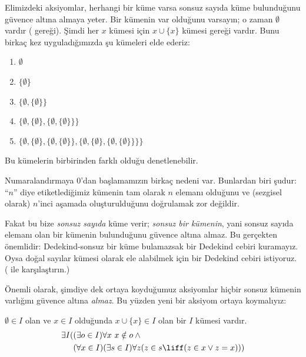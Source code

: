 \documentclass[../../../include/open-logic-section]{subfiles}
\begin{document}

Elimizdeki aksiyomlar, herhangi bir küme varsa sonsuz sayıda küme
bulunduğunu güvence altına almaya yeter. Bir kümenin var olduğunu varsayın;
o zaman $\emptyset$ vardır ( gereği).
Şimdi her $x$ kümesi için $x \cup \{x\}$ kümesi
 gereği vardır. Bunu birkaç
kez uyguladığımızda şu kümeleri elde ederiz:
\begin{enumerate}
	\item[0.] $\emptyset$ %
	\item[1.] $ \{\emptyset\}$ %
	\item[2.] $\{\emptyset, \{\emptyset\}\}$ %
	\item[3.] $\{\emptyset, \{\emptyset\}, \{\emptyset, \{\emptyset\}\}\}$ %
	\item[4.] $\{\emptyset, \{\emptyset\}, \{\emptyset, \{\emptyset\}\}, \{\emptyset, \{\emptyset\}, \{\emptyset, \{\emptyset\}\}\}\}$%
\end{enumerate}
Bu kümelerin birbirinden farklı olduğu denetlenebilir.

Numaralandırmaya $0$'dan başlamamızın birkaç nedeni var. Bunlardan biri
şudur: ``$n$'' diye etiketlediğimiz kümenin tam olarak $n$ elemanı olduğunu
ve (sezgisel olarak) $n$'inci aşamada oluşturulduğunu doğrulamak zor değildir.

Fakat bu bize \emph{sonsuz sayıda} küme verir; \emph{sonsuz bir kümenin},
yani sonsuz sayıda elemanı olan bir kümenin bulunduğunu güvence altına almaz.
Bu gerçekten önemlidir: Dedekind-sonsuz bir küme bulamazsak bir Dedekind
cebiri kuramayız. Oysa doğal sayılar kümesi olarak ele alabilmek için bir
Dedekind cebiri istiyoruz. (
ile karşılaştırın.)

Önemli olarak, şimdiye dek ortaya koyduğumuz aksiyomlar hiçbir sonsuz
kümenin varlığını güvence altına \emph{almaz}. Bu yüzden yeni bir aksiyom
ortaya koymalıyız:

\begin{axiom}[Sonsuzluk]
$\emptyset \in I$ olan ve $x \in I$ olduğunda $x \cup \{x\} \in I$ olan
bir $I$ kümesi vardır.
\begin{align*}
	\exists I( & (\exists o \in I)\forall x\ x \notin o \land {}\\
	& (\forall x \in I)(\exists s \in I)\forall z(z \in s \liff (z \in x \lor z = x)))
\end{align*}
\end{axiom}
\end{document}
